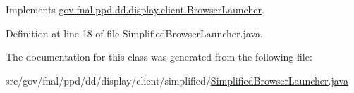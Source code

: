Implements \hyperlink{classgov_1_1fnal_1_1ppd_1_1dd_1_1display_1_1client_1_1BrowserLauncher_a09da69929d79dc20075d5be2572f361c}{gov.\-fnal.\-ppd.\-dd.\-display.\-client.\-Browser\-Launcher}.



Definition at line 18 of file Simplified\-Browser\-Launcher.\-java.



The documentation for this class was generated from the following file\-:\begin{DoxyCompactItemize}
\item 
src/gov/fnal/ppd/dd/display/client/simplified/\hyperlink{SimplifiedBrowserLauncher_8java}{Simplified\-Browser\-Launcher.\-java}\end{DoxyCompactItemize}
